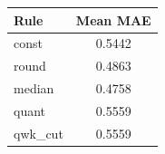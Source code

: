 \begin{table}
\centering
\begin{tabular}{lc}
\hline
Rule & Mean MAE \\
\hline
const & 0.5442 \\
round & 0.4863 \\
median & 0.4758 \\
quant & 0.5559 \\
qwk_cut & 0.5559 \\
\hline
\end{tabular}
\end{table}